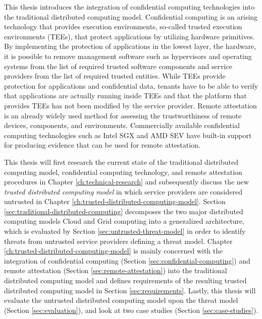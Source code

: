 This thesis introduces the integration of confidential computing technologies
into the traditional distributed computing model. Confidential computing is an
arising technology that provides execution environments, so-called trusted
execution environments (TEEs), that protect applications by utilizing hardware
primitives. By implementing the protection of applications in the lowest layer,
the hardware, it is possible to remove management software such as hypervisors
and operating systems from the list of required trusted software components and
service providers from the list of required trusted entities. While TEEs provide
protection for applications and confidential data, tenants have to be able to
verify that applications are actually running inside TEEs and that the platform
that provides TEEs has not been modified by the service provider. Remote
attestation is an already widely used method for assessing the trustworthiness
of remote devices, components, and environments. Commercially available
confidential computing technologies such as Intel SGX and AMD SEV have built-in
support for producing evidence that can be used for remote attestation.

This thesis will first research the current state of the traditional distributed
computing model, confidential computing technology, and remote attestation
procedures in Chapter \ref{ch:technical-research} and subsequently discuss the
new \textit{trusted distributed computing model} in which service providers are
considered untrusted in Chapter \ref{ch:trusted-distributed-computing-model}.
Section \ref{sec:traditional-distributed-computing} decomposes the two major
distributed computing models Cloud and Grid computing into a generalized
architecture, which is evaluated by Section \ref{sec:untrusted-threat-model} in
order to identify threats from untrusted service providers defining a threat
model. Chapter \ref{ch:trusted-distributed-computing-model} is mainly concerned
with the integration of confidential computing (Section
\ref{sec:confidential-computing}) and remote attestation (Section
\ref{sec:remote-attestation}) into the traditional distributed computing model
and defines requirements of the resulting trusted distributed computing model in
Section \ref{sec:requirements}. Lastly, this thesis will evaluate the untrusted
distributed computing model upon the threat model (Section
\ref{sec:evaluation}), and look at two case studies (Section
\ref{sec:case-studies}).
